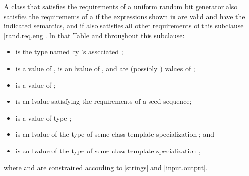 \pnum
A class 
that satisfies the requirements
of a uniform random bit generator
also satisfies the requirements
of a 
if the expressions shown
in 
are valid and have the indicated semantics,
and if  also satisfies all other requirements
of this subclause \ref{rand.req.eng}.
In that Table and throughout this subclause:
\begin{itemize}
  \item
     is the type named by
    's associated ;
  \item
     is a value of ,
     is an lvalue of ,
     and  are (possibly ) values of ;
  \item
     is a value of ;
  \item
     is an lvalue
    satisfying the requirements of a seed sequence;
  \item
     is a value
    of type ;
  \item
     is an lvalue of the type of some class template specialization
     ;
  and
  \item
     is an lvalue of the type of some class template specialization
     ;
\end{itemize}
where  and  are constrained
according to \ref{strings} and \ref{input.output}.

